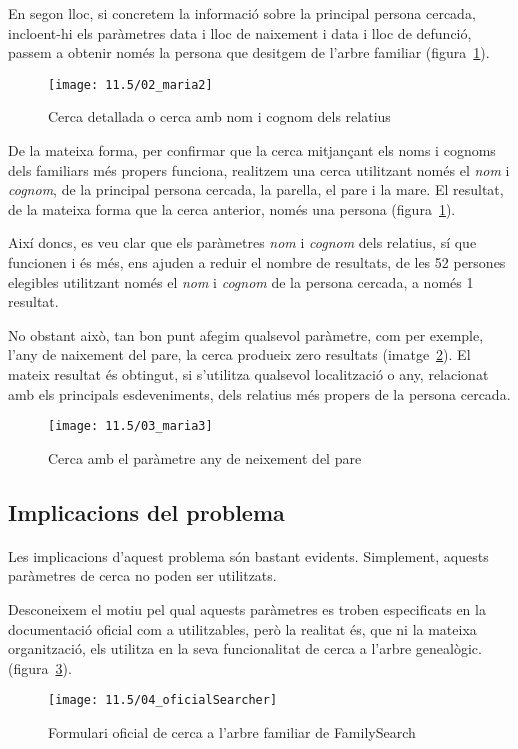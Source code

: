 En segon lloc, si concretem la informació sobre la principal persona cercada, incloent-hi els paràmetres data i lloc de naixement i data i lloc de defunció, passem a obtenir només la persona que desitgem de l'arbre familiar (figura~\ref{fig:maria2}).

\begin{figure}[h]
    \texttt{[image: 11.5/02\_maria2]}
    \centering
    \caption{Cerca detallada o cerca amb nom i cognom dels relatius}\label{fig:maria2}
\end{figure}

De la mateixa forma, per confirmar que la cerca mitjançant els noms i cognoms dels familiars més propers funciona, realitzem una cerca utilitzant només el \emph{nom} i \emph{cognom}, de la principal persona cercada, la parella, el pare i la mare. El resultat, de la mateixa forma que la cerca anterior, només una persona (figura~\ref{fig:maria2}).

Així doncs, es veu clar que els paràmetres \emph{nom} i \emph{cognom} dels relatius, sí que funcionen i és més, ens ajuden a reduir el nombre de resultats, de les 52 persones elegibles utilitzant només el \emph{nom} i \emph{cognom} de la persona cercada, a només 1 resultat.

No obstant això, tan  bon punt afegim qualsevol paràmetre, com per exemple, l'any de naixement del pare, la cerca produeix zero resultats (imatge~\ref{fig:maria3}). El mateix resultat és obtingut, si s'utilitza qualsevol localització o any, relacionat amb els principals esdeveniments, dels relatius més propers de la persona cercada.

\begin{figure}[h]
    \texttt{[image: 11.5/03\_maria3]}
    \centering
    \caption{Cerca amb el paràmetre any de neixement del pare}\label{fig:maria3}
\end{figure}


\subsection{Implicacions del problema}

\paragraph{}
Les implicacions d'aquest problema són bastant evidents. Simplement, aquests paràmetres de cerca no poden ser utilitzats.

Desconeixem el motiu pel qual aquests paràmetres es troben especificats en la documentació oficial com a utilitzables, però la realitat és, que ni la mateixa organit\-zació, els utilitza en la seva funcionalitat de cerca a l'arbre genealògic. (figura~\ref{fig:searchofi}).

\begin{figure}[h]
    \texttt{[image: 11.5/04\_oficialSearcher]}
    \centering
    \caption{Formulari oficial de cerca a l'arbre familiar de FamilySearch}\label{fig:searchofi}
\end{figure}
